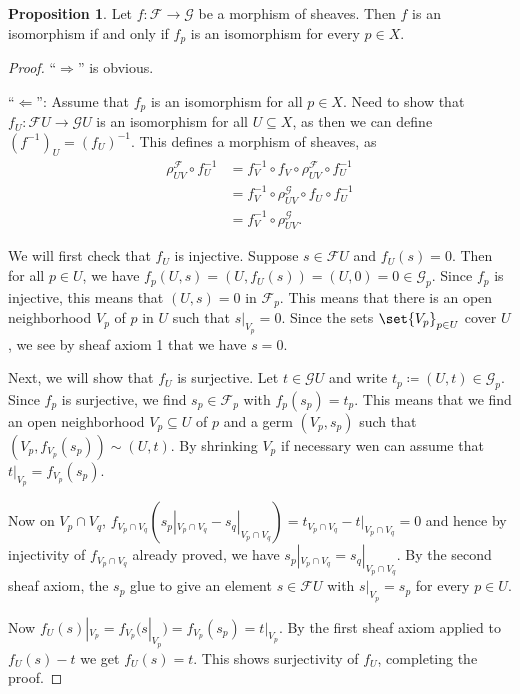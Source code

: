 \documentclass[a4paper]{amsbook}
\theoremstyle{definition}
\newtheorem{proposition}[definition]{Proposition}
\begin{document}
\begin{proposition}
\label{SheafIso}
Let $f\colon \mathcal{F}\to \mathcal{G}$ be a morphism of sheaves. Then
$f$ is an isomorphism if and only if $f_p$ is an isomorphism for every $p \in X$.
\end{proposition}
\begin{proof}[Proof]
\enquote{$\Longrightarrow$} is obvious.

\enquote{$\Longleftarrow$}: Assume that $f_p$ is an isomorphism for all
$p \in X$. Need to show that $f_U\colon \mathcal{F}U \to \mathcal{G}U$ is an
isomorphism for all $U \subseteq X$, as then we can define $(f^{-1})_U = (f_U)^{-1}$.
This defines a morphism of sheaves, as
\begin{align*}
	\rho_{UV}^{\mathcal{F}}\circ f_U^{-1} &= f_V^{-1}\circ f_V \circ \rho_{UV}^{\mathcal{F}} \circ f_U^{-1}\\
	&= f_V^{-1} \circ \rho_{UV}^{\mathcal{G}}\circ f_U \circ f_U^{-1}\\
	&= f_V^{-1} \circ \rho_{UV}^{\mathcal{G}}.
\end{align*}

We will first check that $f_U$ is injective. Suppose $s \in \mathcal{F}U$ and
$f_U(s) = 0$. Then for all $p \in U$, we have $f_p(U, s) = (U, f_U(s)) = (U, 0) = 0 \in \mathcal{G}_p$.
Since $f_p$ is injective, this means that $(U, s) = 0$ in $\mathcal{F}_p$. This
means that there is an open neighborhood $V_p$ of $p$ in $U$ such that
$s|_{V_p} = 0$. Since the sets $\set{V_p}_{p \in U}$ cover $U$, we see by
sheaf axiom 1 that we have $s = 0$.

Next, we will show that $f_U$ is surjective. Let $t \in \mathcal{G}U$ and write
$t_p\coloneqq (U, t) \in \mathcal{G}_p$. Since $f_p$ is surjective, we find $s_p \in \mathcal{F}_p$
with $f_p(s_p) = t_p$. This means that we find an open neighborhood $V_p \subseteq U$ of $p$
and a germ $(V_p, s_p)$ such that $(V_p, f_{V_p}(s_p)) \sim (U, t)$. By
shrinking $V_p$ if necessary wen can assume that $t|_{V_p} = f_{V_p}(s_p)$.

Now on $V_p\cap V_q$, $f_{V_p\cap V_q}(s_p|_{V_p\cap V_q} - s_q|_{V_p\cap V_q}) = t_{V_p\cap V_q} - t|_{V_p\cap V_q} = 0$
and hence by injectivity of $f_{V_p\cap V_q}$ already proved, we have $s_p|_{V_p\cap V_q} = s_q|_{V_p\cap V_q}$.
By the second sheaf axiom, the $s_p$ glue to give an element $s \in \mathcal{F}U$ with
$s|_{V_p} = s_p$ for every $p \in U$.

Now $f_U(s)|_{V_p} = f_{V_p}(s|_{V_p}) = f_{V_p}(s_p) = t|_{V_p}$.
By the first sheaf axiom applied to $f_U(s) - t$ we get $f_U(s) = t$. This shows
surjectivity of $f_U$, completing the proof.
\end{proof}
\end{document}
